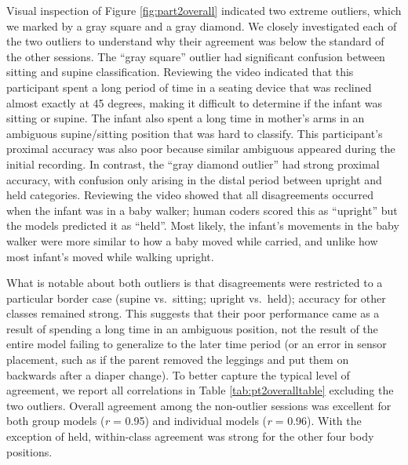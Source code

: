 \documentclass[
  man]{apa6}
\begin{document}
Visual inspection of Figure \ref{fig:part2overall} indicated two extreme outliers, which we marked by a gray square and a gray diamond. We closely investigated each of the two outliers to understand why their agreement was below the standard of the other sessions. The ``gray square'' outlier had significant confusion between sitting and supine classification. Reviewing the video indicated that this participant spent a long period of time in a seating device that was reclined almost exactly at 45 degrees, making it difficult to determine if the infant was sitting or supine. The infant also spent a long time in mother's arms in an ambiguous supine/sitting position that was hard to classify. This participant's proximal accuracy was also poor because similar ambiguous appeared during the initial recording. In contrast, the ``gray diamond outlier'' had strong proximal accuracy, with confusion only arising in the distal period between upright and held categories. Reviewing the video showed that all disagreements occurred when the infant was in a baby walker; human coders scored this as ``upright'' but the models predicted it as ``held''. Most likely, the infant's movements in the baby walker were more similar to how a baby moved while carried, and unlike how most infant's moved while walking upright.

What is notable about both outliers is that disagreements were restricted to a particular border case (supine vs.~sitting; upright vs.~held); accuracy for other classes remained strong. This suggests that their poor performance came as a result of spending a long time in an ambiguous position, not the result of the entire model failing to generalize to the later time period (or an error in sensor placement, such as if the parent removed the leggings and put them on backwards after a diaper change). To better capture the typical level of agreement, we report all correlations in Table \ref{tab:pt2overalltable} excluding the two outliers. Overall agreement among the non-outlier sessions was excellent for both group models (\emph{r} = 0.95) and individual models (\emph{r} = 0.96). With the exception of held, within-class agreement was strong for the other four body positions.
\end{document}
